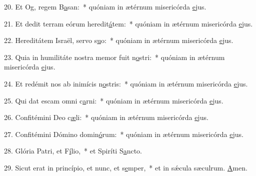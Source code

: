 20. Et Og, regem B\uline{a}san:~* quóniam in ætérnum misericórda \uline{e}jus.\par 
21. Et dedit terram eórum heredit\uline{á}tem:~* quóniam in ætérnum misericórda \uline{e}jus.\par 
22. Hereditátem Israël, servo s\uline{u}o:~* quóniam in ætérnum misericórda \uline{e}jus.\par 
23. Quia in humilitáte nostra memor fuit n\uline{o}stri:~* quóniam in ætérnum misericórda \uline{e}jus.\par 
24. Et redémit nos ab inimícis n\uline{o}stris:~* quóniam in ætérnum misericórda \uline{e}jus.\par 
25. Qui dat escam omni c\uline{a}rni:~* quóniam in ætérnum misericórda \uline{e}jus.\par 
26. Confitémini Deo c\uline{æ}li:~* quóniam in ætérnum misericórda \uline{e}jus.\par 
27. Confitémini Dómino domin\uline{ó}rum:~* quóniam in ætérnum misericórda \uline{e}jus.\par 
28. Glória Patri, et F\uline{í}lio,~* et Spiríti S\uline{a}ncto.\par 
29. Sicut erat in princípio, et nunc, et s\uline{e}mper,~* et in sǽcula sæculrum. \uline{A}men.\par 
